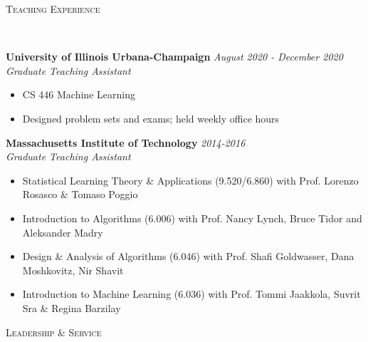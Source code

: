 \documentclass{article}
\newenvironment{changemargin}[2]{%
  \begin{list}{}{%
    \setlength{\topsep}{0pt}%
    \setlength{\leftmargin}{#1}%
    \setlength{\rightmargin}{#2}%
    \setlength{\listparindent}{\parindent}%
    \setlength{\itemindent}{\parindent}%
    \setlength{\parsep}{\parskip}%
  }%
  \item[]}{\end{list}
}
\newcommand{\lineover}{
	\begin{changemargin}{-0.05in}{-0.05in}
		\vspace*{-8pt}
		\hrulefill \\
		\vspace*{-2pt}
	\end{changemargin}
}
\newcommand{\header}[1]{
	\begin{changemargin}{-0.5in}{-0.5in}
		\scshape{#1}\\
  	\lineover
	\end{changemargin}
}
\newenvironment{body} {
	\vspace*{-16pt}
	\begin{changemargin}{-0.25in}{-0.5in}
  }	
	{\end{changemargin}
}
\begin{document}
\header{Teaching Experience}
\begin{body}
	\vspace{16pt}
	
    \textbf{University of Illinois Urbana-Champaign} \hfill \emph{August 2020 - December 2020}\\
	\emph{Graduate Teaching Assistant}\\
	\vspace*{-3pt}
	\begin{itemize} \itemsep -2pt
		\item CS 446 Machine Learning
		\item Designed problem sets and exams; held weekly office hours
	\end{itemize}
    
    \textbf{Massachusetts Institute of Technology} \hfill \emph{2014-2016}\\
	\emph{Graduate Teaching Assistant}\\
	\vspace*{-3pt}
	\begin{itemize} \itemsep -2pt
	\item Statistical Learning Theory \& Applications (9.520/6.860) with Prof. Lorenzo Rosasco \& Tomaso Poggio
        \item Introduction to Algorithms (6.006) with Prof. Nancy Lynch, Bruce Tidor and Aleksander Madry
        \item Design \& Analysis of Algorithms (6.046) with Prof. Shafi Goldwasser, Dana Moshkovitz, Nir Shavit
        \item Introduction to Machine Learning (6.036) with Prof. Tommi Jaakkola, Suvrit Sra \& Regina Barzilay
	\end{itemize}
\end{body}

\header{Leadership \& Service}
\end{document}
